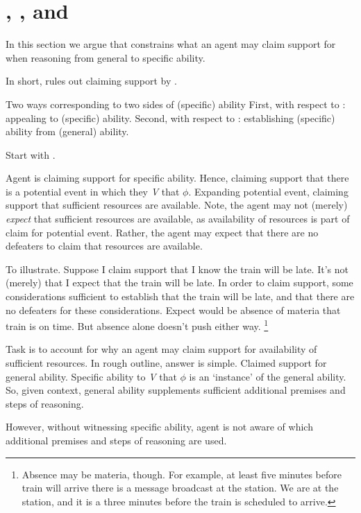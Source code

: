 \chapter{\ESU{}, \gsi{}, and }
\label{sec:first-conditional}

\begin{note}[Summary]
  In this section we argue that \ESU{} constrains what an agent may claim support for when reasoning from general to specific ability.

  In short, \ESU{} rules out claiming support by \adB{}.
\end{note}

\begin{note}
  Two ways corresponding to two sides of (specific) ability
  First, with respect to : appealing to (specific) ability.
  Second, with respect to \gsi{}: establishing (specific) ability from (general) ability.
\end{note}

\begin{note}
  Start with \gsi{}.

  Agent is claiming support for specific ability.
  Hence, claiming support that there is a potential event in which they \emph{V} that \(\phi\).
  Expanding potential event, claiming support that sufficient resources are available.
  Note, the agent may not (merely) \emph{expect} that sufficient resources are available, as availability of resources is part of claim for potential event.
  Rather, the agent may expect that there are no defeaters to claim that resources are available.

  To illustrate.
  Suppose I claim support that I know the train will be late.
  It's not (merely) that I expect that the train will be late.
  In order to claim support, some considerations sufficient to establish that the train will be late, and that there are no defeaters for these considerations.
  Expect would be absence of materia that train is on time.
  But absence alone doesn't push either way.\nolinebreak
  \footnote{
    Absence may be materia, though.
    For example, at least five minutes before train will arrive there is a message broadcast at the station.
    We are at the station, and it is a three minutes before the train is scheduled to arrive.
  }

  Task is to account for why an agent may claim support for availability of sufficient resources.
  In rough outline, answer is simple.
  Claimed support for general ability.
  Specific ability to \emph{V} that \(\phi\) is an `instance' of the general ability.
  So, given context, general ability supplements sufficient additional premises and steps of reasoning.

  However, without witnessing specific ability, agent is not aware of which additional premises and steps of reasoning are used.
\end{note}

